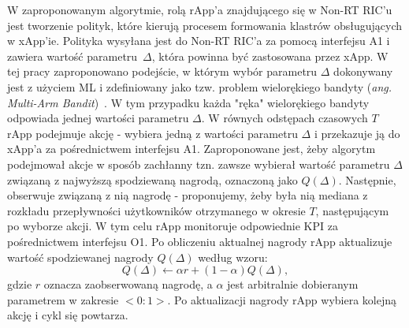 \documentclass[a4paper]{article}
\begin{document}
\begin{multicols}{2}
W zaproponowanym algorytmie, rolą rApp'a znajdującego się w Non-RT RIC'u jest tworzenie polityk, które kierują procesem formowania klastrów obsługujących w xApp'ie. Polityka wysyłana jest do Non-RT RIC'a za pomocą interfejsu A1 i zawiera wartość parametru~$\Delta$, która powinna być zastosowana przez xApp. W tej pracy zaproponowano podejście, w którym wybór parametru $\Delta$ dokonywany jest z użyciem ML i zdefiniowany jako tzw. problem wielorękiego bandyty (\textit{ang. Multi-Arm Bandit})~\cite{Sutton1998}. W tym przypadku każda "ręka" wielorękiego bandyty odpowiada jednej wartości parametru $\Delta$. W równych odstępach czasowych $T$ rApp podejmuje akcję - wybiera jedną z wartości parametru $\Delta$ i przekazuje ją do xApp'a za pośrednictwem interfejsu A1. Zaproponowane jest, żeby algorytm podejmował akcje w sposób zachłanny tzn. zawsze wybierał wartość parametru $\Delta$ związaną z najwyższą spodziewaną nagrodą, oznaczoną jako $Q(\Delta)$. Następnie, obserwuje związaną z nią nagrodę - proponujemy, żeby była nią mediana z rozkładu przepływności użytkowników otrzymanego w okresie $T$, następującym po wyborze akcji. W tym celu rApp monitoruje odpowiednie KPI za pośrednictwem interfejsu O1. Po obliczeniu aktualnej nagrody rApp aktualizuje wartość spodziewanej nagrody $Q(\Delta)$ według wzoru:
\begin{equation}
    Q(\Delta) \leftarrow \alpha r + (1-\alpha)Q(\Delta),
\end{equation}
gdzie $r$ oznacza zaobserwowaną nagrodę, a $\alpha$ jest arbitralnie dobieranym parametrem w zakresie $<0:1>$. Po aktualizacji nagrody rApp wybiera kolejną akcję i cykl się powtarza.


\end{multicols}
\end{document}
